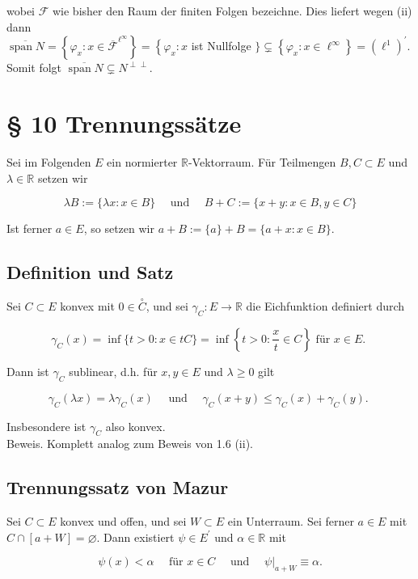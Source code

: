 \documentclass[10pt, letterpaper]{article}
\begin{document}
wobei $\mathcal{F}$ wie bisher den Raum der finiten Folgen bezeichne. Dies liefert wegen (ii) dann\\
$\overline{\operatorname{span} N}=\left\{\varphi_{x}: x \in \overline{\mathcal{F}}^{\ell^{\infty}}\right\}=\left\{\varphi_{x}: x\right.$ ist Nullfolge $\} \subsetneq\left\{\varphi_{x}: x \in \ell^{\infty}\right\}=\left(\ell^{1}\right)^{\prime}$. Somit folgt $\overline{\operatorname{span} N} \subsetneq N^{\perp \perp}$.

\section*{§ 10 Trennungssätze}
Sei im Folgenden $E$ ein normierter $\mathbb{R}$-Vektorraum. Für Teilmengen $B, C \subset E$ und $\lambda \in \mathbb{R}$ setzen wir

$$
\lambda B:=\{\lambda x: x \in B\} \quad \text { und } \quad B+C:=\{x+y: x \in B, y \in C\}
$$

Ist ferner $a \in E$, so setzen wir $a+B:=\{a\}+B=\{a+x: x \in B\}$.

\subsection*{Definition und Satz}
Sei $C \subset E$ konvex mit $0 \in \stackrel{\circ}{C}$, und sei $\gamma_{C}: E \rightarrow \mathbb{R}$ die Eichfunktion definiert durch

$$
\gamma_{C}(x)=\inf \{t>0: x \in t C\}=\inf \left\{t>0: \frac{x}{t} \in C\right\} \text { für } x \in E \text {. }
$$

Dann ist $\gamma_{C}$ sublinear, d.h. für $x, y \in E$ und $\lambda \geq 0$ gilt

$$
\gamma_{C}(\lambda x)=\lambda \gamma_{C}(x) \quad \text { und } \quad \gamma_{C}(x+y) \leq \gamma_{C}(x)+\gamma_{C}(y) \text {. }
$$

Insbesondere ist $\gamma_{C}$ also konvex.\\
Beweis. Komplett analog zum Beweis von 1.6 (ii).

\subsection*{Trennungssatz von Mazur}
Sei $C \subset E$ konvex und offen, und sei $W \subset E$ ein Unterraum. Sei ferner $a \in E$ mit $C \cap[a+W]=\varnothing$. Dann existiert $\psi \in E^{\prime}$ und $\alpha \in \mathbb{R}$ mit

$$
\psi(x)<\alpha \quad \text { für } x \in C \quad \text { und }\left.\quad \psi\right|_{a+W} \equiv \alpha .
$$
\end{document}
